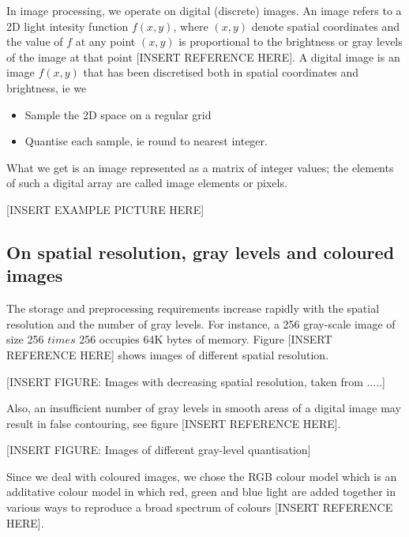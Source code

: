 In image processing, we operate on digital (discrete) images.
An image refers to a 2D light intesity function \( f(x,y) \), where \( (x,y) \) denote spatial coordinates and the value of \( f \) at any point \( (x,y) \) is proportional to the brightness or gray levels of the image at that point [INSERT REFERENCE HERE].
A digital image is an image \( f(x,y)  \) that has been discretised both in spatial coordinates and brightness, ie we

\begin{itemize}
	\item Sample the 2D space on a regular grid
	\item Quantise each sample, ie round to nearest integer.
\end{itemize}

What we get is an image represented as a matrix of integer values; the elements of such a digital array are called image elements or pixels.


[INSERT EXAMPLE PICTURE HERE]


\subsection{On spatial resolution, gray levels and coloured images}

The storage and preprocessing requirements increase rapidly with the spatial resolution and the number of gray levels. 
For instance, a 256 gray-scale image of size 256 \( times \) 256 occupies 64K bytes of memory. Figure [INSERT REFERENCE HERE] shows images of different spatial resolution. 

[INSERT FIGURE: Images with decreasing spatial resolution, taken from .....]

Also, an insufficient number of gray levels in smooth areas of a digital image may result in false contouring, see figure [INSERT REFERENCE HERE].

[INSERT FIGURE: Images of different gray-level quantisation]


Since we deal with coloured images, we chose the RGB colour model which is an additative colour model in which red, green and blue light are added together in various ways to reproduce a broad spectrum of colours [INSERT REFERENCE HERE].


